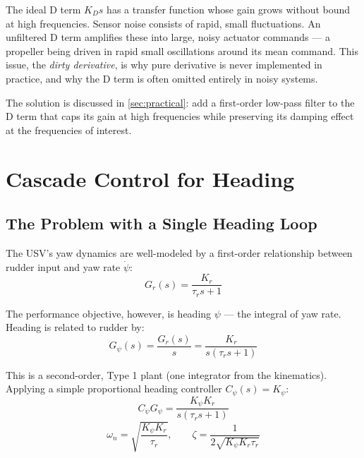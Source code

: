 \documentclass[12pt]{article}
\begin{document}
The ideal D term $K_D s$ has a transfer function whose gain grows without
bound at high frequencies.  Sensor noise consists of rapid, small fluctuations.
An unfiltered D term amplifies these into large, noisy actuator commands --- a
propeller being driven in rapid small oscillations around its mean command.
This issue, the \emph{dirty derivative}, is why pure derivative is never implemented in practice, and why the D term is often omitted entirely in noisy systems.

The solution is discussed in \cref{sec:practical}: add a first-order low-pass filter to
the D term that caps its gain at high frequencies while preserving its
damping effect at the frequencies of interest.


\section{Cascade Control for Heading}
\label{sec:cascade}

\subsection{The Problem with a Single Heading Loop}

The USV's yaw dynamics are well-modeled by a first-order relationship between
rudder input and yaw rate $\dot\psi$:
\begin{equation}
  G_r(s) = \frac{K_r}{\tau_r s + 1}
  \label{eq:yaw_rate_plant}
\end{equation}

The performance objective, however, is heading $\psi$ --- the integral of yaw
rate.  Heading is related to rudder by:
\begin{equation}
  G_\psi(s) = \frac{G_r(s)}{s} = \frac{K_r}{s(\tau_r s + 1)}
  \label{eq:heading_plant}
\end{equation}

This is a second-order, Type 1 plant (one integrator from the kinematics).
Applying a simple proportional heading controller $C_\psi(s) = K_\psi$:
\[
  C_\psi G_\psi = \frac{K_\psi K_r}{s(\tau_r s + 1)}
\]
\begin{equation}
  \omega_n = \sqrt{\frac{K_\psi K_r}{\tau_r}}, \qquad
  \zeta = \frac{1}{2\sqrt{K_\psi K_r \tau_r}}
  \label{eq:heading_p}
\end{equation}
\end{document}
